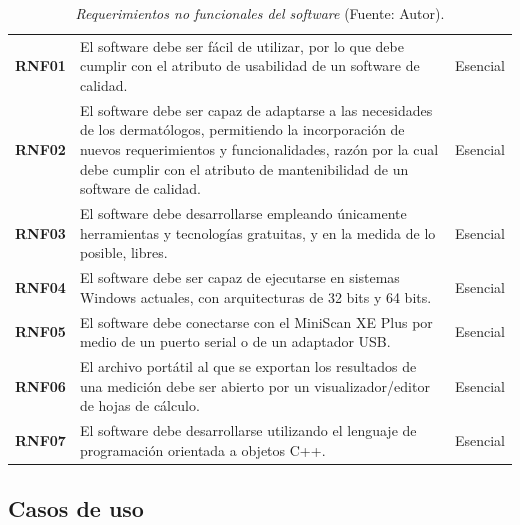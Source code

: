 	\begin{table}[h]
		\small
		\caption[Requerimientos no funcionales del software]{\textit{Requerimientos no funcionales del software} (Fuente: Autor).}
		\centering
		\setlength{\extrarowheight}{\altocelda}
		\begin{tabulary}{\anchotabla}{|c|J|c|}
			\hline
			 &  & \\ \hline
			\textbf{RNF01} & El software debe ser f\'{a}cil de utilizar, por lo que debe cumplir con el atributo de usabilidad de un software de calidad. & Esencial\\ \hline
			\textbf{RNF02} & El software debe ser capaz de adaptarse a las necesidades de los dermat\'{o}logos, permitiendo la incorporaci\'{o}n de nuevos requerimientos y funcionalidades, raz\'{o}n por la cual debe cumplir con el atributo de mantenibilidad de un software de calidad. & Esencial\\ \hline
			\textbf{RNF03} & El software debe desarrollarse empleando \'{u}nicamente herramientas y tecnolog\'{i}as gratuitas, y en la medida de lo posible, libres. & Esencial\\ \hline
			\textbf{RNF04} & El software debe ser capaz de ejecutarse en sistemas Windows actuales, con arquitecturas de 32 bits y 64 bits. & Esencial\\ \hline
			\textbf{RNF05} & El software debe conectarse con el MiniScan XE Plus por medio de un puerto serial o de un adaptador USB. & Esencial\\ \hline
			\textbf{RNF06} & El archivo port\'{a}til al que se exportan los resultados de una medici\'{o}n debe ser abierto por un visualizador/editor de hojas de c\'{a}lculo. & Esencial\\ \hline
			\textbf{RNF07} & El software debe desarrollarse utilizando el lenguaje de programaci\'{o}n orientada a objetos C++. & Esencial\\ \hline
		\end{tabulary}
	\end{table}
	
\newpage

\subsection{Casos de uso}

